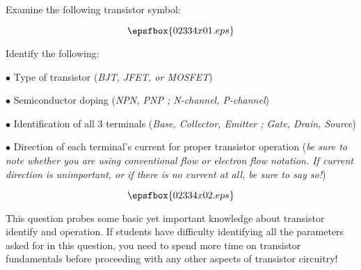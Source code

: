 

Examine the following transistor symbol:

$$\epsfbox{02334x01.eps}$$

\goodbreak

Identify the following:

\medskip
\item{$\bullet$} Type of transistor ({\it BJT, JFET, or MOSFET})
\item{$\bullet$} Semiconductor doping ({\it NPN, PNP ; N-channel, P-channel})
\item{$\bullet$} Identification of all 3 terminals ({\it Base, Collector, Emitter ; Gate, Drain, Source})
\item{$\bullet$} Direction of each terminal's current for proper transistor operation ({\it be sure to note whether you are using conventional flow or electron flow notation.  If current direction is unimportant, or if there is no current at all, be sure to say so!})
\medskip







$$\epsfbox{02334x02.eps}$$







This question probes some basic yet important knowledge about transistor identify and operation.  If students have difficulty identifying all the parameters asked for in this question, you need to spend more time on transistor fundamentals before proceeding with any other aspects of transistor circuitry!




